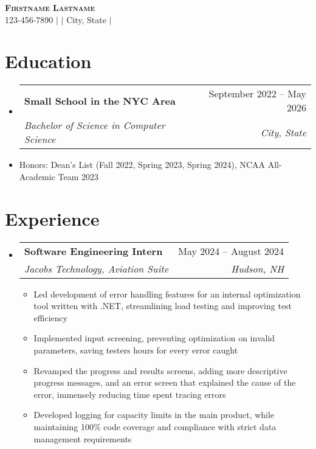 \documentclass[letterpaper,11pt]{article}
\makeatletter
\newcommand{\resumeItem}[1]{
  \item\small{
    {#1 \vspace{-2pt}}
  }
}
\newcommand{\resumeSubheading}[4]{
  \vspace{-2pt}\item
    \begin{tabular*}{0.97\textwidth}[t]{l@{\extracolsep{\fill}}r}
      \textbf{#1} & #2 \\
      \textit{\small#3} & \textit{\small #4} \\
    \end{tabular*}\vspace{-7pt}
}
\newcommand{\resumeSubItem}[1]{\resumeItem{#1}\vspace{-4pt}}
\newcommand{\resumeSubHeadingListStart}{\begin{itemize}[leftmargin=0.15in, label={}]}
\newcommand{\resumeSubHeadingListEnd}{\end{itemize}}
\newcommand{\resumeItemListStart}{\begin{itemize}}
\newcommand{\resumeItemListEnd}{\end{itemize}\vspace{-5pt}}
\makeatother
\begin{document}

\begin{center}
    \textbf{\Huge \scshape Firstname Lastname} \\ \vspace{3pt}
    \small 123-456-7890 $|$ \href{mailto:my@email.com}{\underline{}} $|$ \small{City, State} $|$
    \href{https://portfolio-website.com}{\underline{}} \\ \vspace{-3pt}
\end{center}


\section{Education}
  \resumeSubHeadingListStart
    \resumeSubheading
      {Small School in the NYC Area}{September 2022 -- May 2026}
      {Bachelor of Science in Computer Science}{City, State}
    \resumeSubItem{Honors: Dean's List (Fall 2022, Spring 2023, Spring 2024), NCAA All-Academic Team 2023}
  \resumeSubHeadingListEnd


\section{Experience}
  \resumeSubHeadingListStart

    \resumeSubheading
      {Software Engineering Intern}{May 2024 -- August 2024}
      {Jacobs Technology, Aviation Suite}{Hudson, NH}
      \resumeItemListStart
        \resumeItem{Led development of error handling features for an internal optimization tool written with .NET, streamlining load testing and improving test efficiency}
        \resumeItem{Implemented input screening, preventing optimization on invalid parameters, saving testers hours for every error caught}
        \resumeItem{Revamped the progress and results screens, adding more descriptive progress messages, and an error screen that explained the cause of the error, immensely reducing time spent tracing errors}
        \resumeItem{Developed logging for capacity limits in the main product, while maintaining 100\% code coverage and compliance with strict data management requirements}
      \resumeItemListEnd
    \resumeSubHeadingListEnd
      
\end{document}
